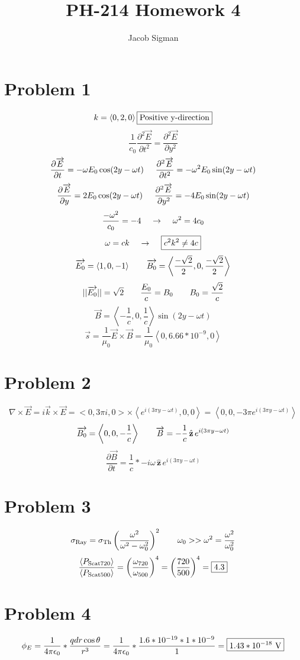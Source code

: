 \documentclass{article}
\title{PH-214 Homework 4}
\author{Jacob Sigman}
\date{}
\begin{document}
\maketitle
\section*{Problem 1}
\[k=\left<0,2,0\right>\boxed{\textnormal{Positive y-direction}}\]
\[\frac{1}{c_0}\frac{\partial^2\overrightarrow{E}}{\partial t^2}=\frac{\partial^2\overrightarrow{E}}{\partial y^2}\]
\[\frac{\partial\overrightarrow{E}}{\partial t}=-\omega E_0\cos(2y-\omega t)\hspace{5 mm}\frac{\partial^2\overrightarrow{E}}{\partial t^2}=-\omega^2 E_0\sin(2y-\omega t)\]
\[\frac{\partial\overrightarrow{E}}{\partial y}=2E_0\cos(2y-\omega t)\hspace{5 mm}\frac{\partial^2\overrightarrow{E}}{\partial y^2}=-4E_0\sin(2y-\omega t)\]
\[\frac{-\omega^2}{c_0}=-4\hspace{4 mm}\rightarrow\hspace{4 mm}\omega^2=4c_0\]
\[\omega=ck\hspace{4 mm}\rightarrow\hspace{4 mm}\boxed{c^2k^2\neq4c}\]
\[\overrightarrow{E_0}=\left<1,0,-1\right>\hspace{7 mm}\overrightarrow{B_0}=\left<\frac{-\sqrt2}{2},0,\frac{-\sqrt2}{2}\right>\]
\[||\overrightarrow{E_0}||=\sqrt2\hspace{7 mm}\frac{E_0}{c}=B_0\hspace{7 mm}B_0=\frac{\sqrt2}{c}\]
\[\boxed{\overrightarrow{B}=\left<-\frac{1}{c},0,\frac{1}{c}\right>\sin(2y-\omega t)}\]
\[\overrightarrow{s}=\frac{1}{\mu_0}\overrightarrow{E}\times\overrightarrow{B}=\boxed{\frac{1}{\mu_0}\left<0,6.66*10^{-9},0\right>}\]
\section*{Problem 2}
\[\nabla\times\overrightarrow{E}=i\overrightarrow{k}\times\overrightarrow{E}=<0,3\pi i,0>\times\left<e^{i(3\pi y-\omega t)},0,0\right>=\left<0,0,-3\pi e^{i(3\pi y-\omega t)}\right>\]
\[\overrightarrow{B_0}=\left<0,0,-\frac{1}{c}\right>\hspace{7 mm}\overrightarrow{B}=-\frac{1}{c}\,\hat{\textbf{z}}\,e^{i(3\pi y-\omega t)}\]
\[\frac{\partial\overrightarrow{B}}{\partial t}=\frac{1}{c}*-i\omega\,\hat{\textbf{z}}\,e^{i(3\pi y-\omega t)}\]
\section*{Problem 3}
\[\sigma_\textnormal{Ray}=\sigma_\textnormal{Th}\left(\frac{\omega^2}{\omega^2-\omega_0^2}\right)^2\hspace{7 mm}\omega_0 >> \omega^2=\frac{\omega^2}{\omega_0^2}\]
\[\frac{\left<P_{\textnormal{Scat720}}\right>}{\left<P_{\textnormal{Scat500}}\right>}=\left(\frac{\omega_{720}}{\omega_{500}}\right)^4=\left(\frac{720}{500}\right)^4=\boxed{4.3}\]
\section*{Problem 4}
\[\phi_E=\frac{1}{4\pi\epsilon_0}*\frac{qdr\cos\theta}{r^3}=\frac{1}{4\pi\epsilon_0}*\frac{1.6*10^{-19}*1*10^{-9}}{1}=\boxed{1.43*10^{-18}\textnormal{ V}}\]
\end{document}
